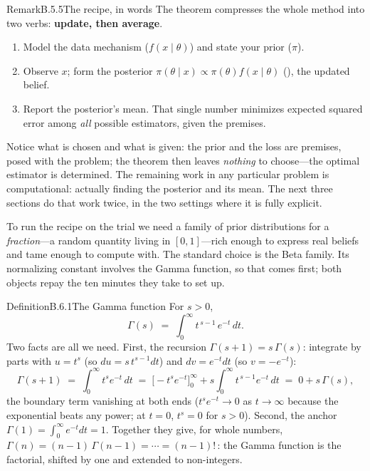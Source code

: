 \documentclass[main.tex]{subfiles}
\begin{document}
\begin{ObjL}{Remark}{B.5.5}{The recipe, in words}
The theorem compresses the whole method into two verbs: \textbf{update, then average}.
\begin{enumerate}[leftmargin=2.2em,itemsep=2pt,topsep=2pt]
  \item Model the data mechanism ($f(x\mid\theta)$) and state your prior ($\pi$).
  \item Observe $x$; form the posterior $\pi(\theta\mid x)\propto\pi(\theta)f(x\mid\theta)$
        (), the updated belief.
  \item Report the posterior's mean. That single number minimizes expected squared error
        among \emph{all} possible estimators, given the premises.
\end{enumerate}
Notice what is chosen and what is given: the prior and the loss are premises, posed with the
problem; the theorem then leaves \emph{nothing} to choose---the optimal estimator is
determined. The remaining work in any particular problem is computational: actually finding
the posterior and its mean. The next three sections do that work twice, in the two settings
where it is fully explicit.
\end{ObjL}


To run the recipe on the trial we need a family of prior distributions for a
\emph{fraction}---a random quantity living in $[0,1]$---rich enough to express real beliefs
and tame enough to compute with. The standard choice is the Beta family. Its normalizing
constant involves the Gamma function, so that comes first; both objects repay the ten
minutes they take to set up.

\begin{Obj}{Definition}{B.6.1}{The Gamma function}
For $s>0$,
\[ \Gamma(s) \;=\; \int_0^{\infty} t^{\,s-1}\, e^{-t}\, dt . \]
Two facts are all we need. First, the recursion $\Gamma(s+1)=s\,\Gamma(s)$: integrate by
parts with $u=t^{s}$ (so $du=s\,t^{s-1}dt$) and $dv=e^{-t}dt$ (so $v=-e^{-t}$):
\[ \Gamma(s+1) \;=\; \int_0^{\infty} t^{s} e^{-t}\, dt
   \;=\; \Big[ -t^{s} e^{-t} \Big]_0^{\infty} + s\int_0^{\infty} t^{\,s-1} e^{-t}\, dt
   \;=\; 0 + s\,\Gamma(s) , \]
the boundary term vanishing at both ends ($t^s e^{-t}\to0$ as $t\to\infty$ because the
exponential beats any power; at $t=0$, $t^s=0$ for $s>0$). Second, the anchor
$\Gamma(1)=\int_0^\infty e^{-t}dt=1$. Together they give, for whole numbers,
$\Gamma(n) = (n-1)\,\Gamma(n-1) = \cdots = (n-1)!$\,: the Gamma function is the factorial,
shifted by one and extended to non-integers.
\end{Obj}
\end{document}
